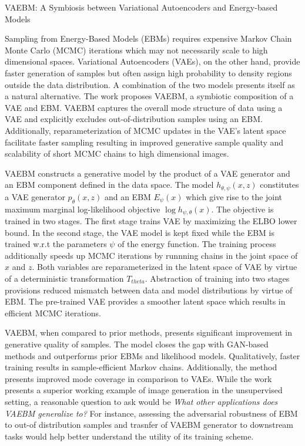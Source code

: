 \documentclass[12pt,letterpaper]{article}
\begin{document}
\begin{center}
  \large{VAEBM: A Symbiosis between Variational Autoencoders and Energy-based Models}
\end{center}

Sampling from Energy-Based Models (EBMs) requires expensive Markov Chain Monte Carlo (MCMC) iterations which may not necessarily scale to high dimensional spaces. Variational Autoencoders (VAEs), on the other hand, provide faster generation of samples but often assign high probability to density regions outside the data distribution. A combination of the two models presents itself as a natural alternative. The work proposes VAEBM, a symbiotic composition of a VAE and EBM. VAEBM captures the overall mode structure of data using a VAE and explicitly excludes out-of-distribution samples using an EBM. Additionally, reparameterization of MCMC updates in the VAE's latent space facilitate faster sampling resulting in improved generative sample quality and scalability of short MCMC chains to high dimensional images.

VAEBM constructs a generative model by the product of a VAE generator and an EBM component defined in the data space. The model $h_{\theta,\psi}(x,z)$ constitutes a VAE generator $p_{\theta}(x,z)$ and an EBM $E_{\psi}(x)$ which give rise to the joint maximum marginal log-likelihood objective $\log h_{\psi,\theta}(x)$. The objective is trained in two stages. The first stage trains VAE by maximizing the ELBO lower bound. In the second stage, the VAE model is kept fixed while the EBM is trained w.r.t the parameters $\psi$ of the energy function. The training process additionally speeds up MCMC iterations by runnning chains in the joint space of $x$ and $z$. Both variables are reparameterized in the latent space of VAE by virtue of a deterministic transformation $T_{theta}$. Abstraction of training into two stages provisions reduced mismatch between data and model distributions by virtue of EBM. The pre-trained VAE provides a smoother latent space which results in efficient MCMC iterations. 

VAEBM, when compared to prior methods, presents significant improvement in generative quality of samples. The model closes the gap with GAN-based methods and outperforms prior EBMs and likelihood models. Qualitatively, faster training results in sample-efficient Markov chains. Additionally, the method presents improved mode coverage in comparison to VAEs. While the work presents a superior working example of image generation in the unsupervised setting, a reasonable question to ask would be \textit{What other applications does VAEBM generalize to?} For instance, assessing the adversarial robustness of EBM to out-of distribution samples and trasnfer of VAEBM generator to downstream tasks would help better understand the utility of its training scheme.
\end{document}
